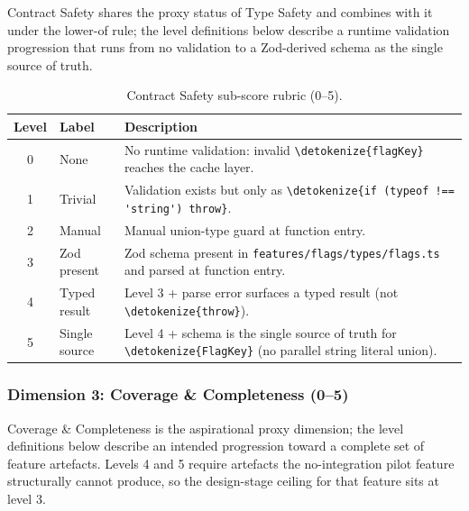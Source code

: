 \documentclass[12pt,a4paper]{report}
\newcommand{\code}[1]{\texttt{\nolinkurl{\detokenize{#1}}}}
\DeclareRobustCommand{\filename}[1]{\bgroup\urlstyle{tt}\nolinkurl{#1}\egroup}
\begin{document}
Contract Safety shares the proxy status of Type Safety and combines with it under the lower-of rule; the level definitions below describe a runtime validation progression that runs from no validation to a Zod-derived schema as the single source of truth.

\begin{table}[H]
\centering
\begin{tabular}{clp{9cm}}
\toprule
\textbf{Level} & \textbf{Label} & \textbf{Description} \\
\midrule
0 & None & No runtime validation: invalid \code{flagKey} reaches the cache layer. \\
1 & Trivial & Validation exists but only as \code{if (typeof !== 'string') throw}. \\
2 & Manual & Manual union-type guard at function entry. \\
3 & Zod present & Zod schema present in \filename{features/flags/types/flags.ts} and parsed at function entry. \\
4 & Typed result & Level 3 + parse error surfaces a typed result (not \code{throw}). \\
5 & Single source & Level 4 + schema is the single source of truth for \code{FlagKey} (no parallel string literal union). \\
\bottomrule
\end{tabular}
\caption{Contract Safety sub-score rubric (0--5).}
\label{tab:rubric-contract}
\end{table}

\subsubsection{Dimension 3: Coverage \& Completeness (0--5)}

Coverage \& Completeness is the aspirational proxy dimension; the level definitions below describe an intended progression toward a complete set of feature artefacts. Levels 4 and 5 require artefacts the no-integration pilot feature structurally cannot produce, so the design-stage ceiling for that feature sits at level 3.
\end{document}
